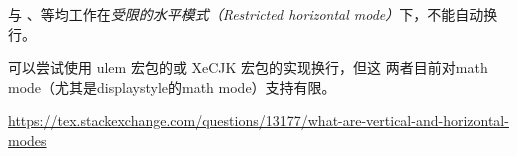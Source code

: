 










与 、等均工作在\textit{受限的水平模式（Restricted
horizontal mode）}下，不能自动换行。

可以尝试使用 ulem 宏包的或 XeCJK 宏包的实现换行，但这
两者目前对math mode（尤其是displaystyle的math mode）支持有限。

\begin{reference}
  \item \url{https://tex.stackexchange.com/questions/13177/what-are-vertical-and-horizontal-modes}
\end{reference}













